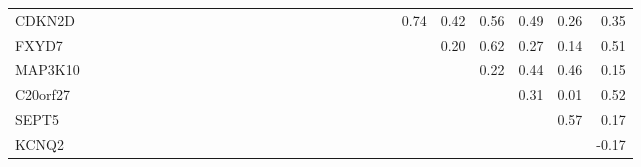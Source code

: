 \begin{longtable}{lrrrrrrrrrrrrrrrrrrrrrrrrrrrr}
CDKN2D     &              &              &              &              &             &              &           &             &            &             &             &               &             &            &              &            &               &            &           &                  &             &              &        0.74 &          0.42 &           0.56 &        0.49 &        0.26 &         0.35 \\
FXYD7      &              &              &              &              &             &              &           &             &            &             &             &               &             &            &              &            &               &            &           &                  &             &              &             &          0.20 &           0.62 &        0.27 &        0.14 &         0.51 \\
MAP3K10    &              &              &              &              &             &              &           &             &            &             &             &               &             &            &              &            &               &            &           &                  &             &              &             &               &           0.22 &        0.44 &        0.46 &         0.15 \\
C20orf27   &              &              &              &              &             &              &           &             &            &             &             &               &             &            &              &            &               &            &           &                  &             &              &             &               &                &        0.31 &        0.01 &         0.52 \\
SEPT5      &              &              &              &              &             &              &           &             &            &             &             &               &             &            &              &            &               &            &           &                  &             &              &             &               &                &             &        0.57 &         0.17 \\
KCNQ2      &              &              &              &              &             &              &           &             &            &             &             &               &             &            &              &            &               &            &           &                  &             &              &             &               &                &             &             &        -0.17 \\
\end{longtable}


